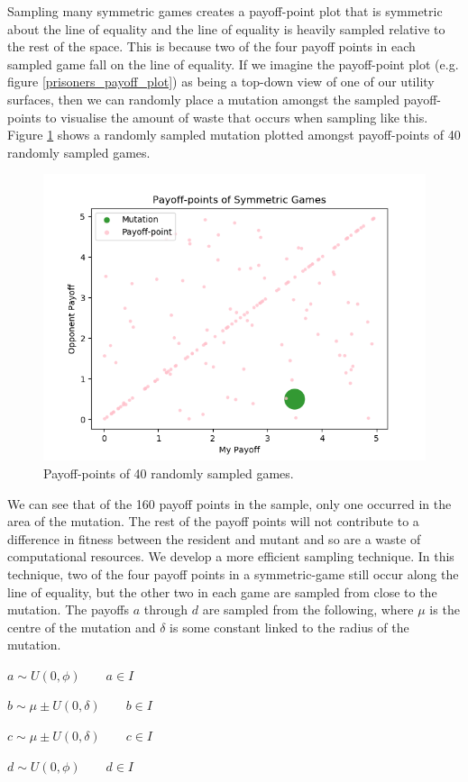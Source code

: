 \documentclass[11pt]{book}
\newcommand*{\np}{\par\noindent\newline}
\begin{document}
\np Sampling many symmetric games creates a payoff-point plot that is symmetric about the line of equality and the line of equality is heavily sampled relative to the rest of the space.
This is because two of the four payoff points in each sampled game fall on the line of equality.
If we imagine the payoff-point plot (e.g. figure \ref{prisoners_payoff_plot}) as being a top-down view of one of our utility surfaces,
then we can randomly place a mutation amongst the sampled payoff-points to visualise the amount of waste that occurs when sampling like this.
Figure \ref{symmetric_payoff_plot} shows a randomly sampled mutation plotted amongst payoff-points of 40 randomly sampled games.
\begin{figure}
	\centering
	\includegraphics[scale=0.7]{resources/scatter_symmetric_mutation.png}
	\caption{Payoff-points of 40 randomly sampled games.}
	\label{symmetric_payoff_plot}
\end{figure}
We can see that of the 160 payoff points in the sample, only one occurred in the area of the mutation.
The rest of the payoff points will not contribute to a difference in fitness between the resident and mutant and so are a waste of computational resources.
We develop a more efficient sampling technique.
In this technique, two of the four payoff points in a symmetric-game still occur along the line of equality,
but the other two in each game are sampled from close to the mutation.
The payoffs $a$ through $d$ are sampled from the following, where $\mu$ is the centre of the mutation and $\delta$ is some constant linked to the radius of the mutation.
\begin{center}\label{local_a_through_d}	
	$a \sim U(0,\phi) \qquad a \in I$
	
	$b \sim \mu \pm U(0,\delta) \qquad b \in I$
	
	$c \sim \mu \pm U(0,\delta) \qquad c \in I$
	
	$d \sim U(0,\phi) \qquad d \in I$
\end{center}
\end{document}
